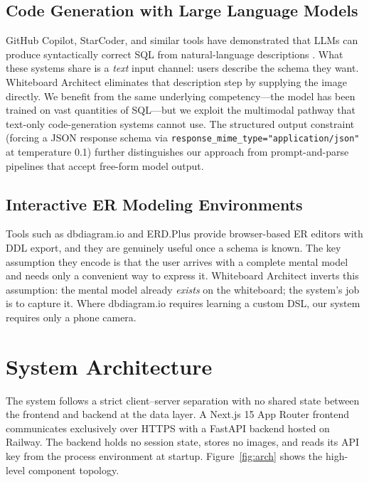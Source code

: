 \documentclass[conference]{IEEEtran}
\begin{document}
\subsection{Code Generation with Large Language Models}

GitHub Copilot, StarCoder, and similar tools have demonstrated that
LLMs can produce syntactically correct SQL from natural-language
descriptions \cite{b5}. What these systems share is a \emph{text}
input channel: users describe the schema they want. Whiteboard
Architect eliminates that description step by supplying the image
directly. We benefit from the same underlying competency---the
model has been trained on vast quantities of SQL---but we exploit
the multimodal pathway that text-only code-generation systems cannot
use. The structured output constraint (forcing a JSON response
schema via \texttt{response\_mime\_type="application/json"} at
temperature 0.1) further distinguishes our approach from
prompt-and-parse pipelines that accept free-form model output.

\subsection{Interactive ER Modeling Environments}

Tools such as dbdiagram.io and ERD.Plus provide browser-based ER
editors with DDL export, and they are genuinely useful once a schema
is known. The key assumption they encode is that the user arrives
with a complete mental model and needs only a convenient way to
express it. Whiteboard Architect inverts this assumption: the
mental model already \emph{exists} on the whiteboard; the system's
job is to capture it. Where dbdiagram.io requires learning a custom
DSL, our system requires only a phone camera.

\section{System Architecture}

The system follows a strict client--server separation with no
shared state between the frontend and backend at the data layer.
A Next.js 15 App Router frontend communicates exclusively over
HTTPS with a FastAPI backend hosted on Railway. The backend holds
no session state, stores no images, and reads its API key from
the process environment at startup. Figure~\ref{fig:arch} shows
the high-level component topology.
\end{document}
